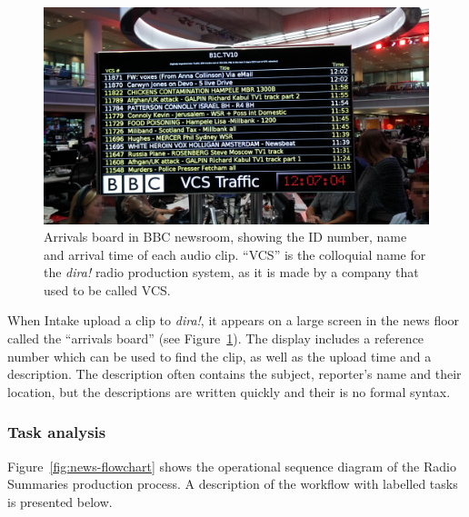 \begin{figure}[p]
  \centering
  \includegraphics[width=\columnwidth]{figs/news-intake-pixelated.jpg}
  \caption[Arrivals board in the BBC newsroom.]{Arrivals board in BBC newsroom, showing the ID number, name and arrival
  time of each audio clip.  ``VCS'' is the colloquial name for the \textit{dira!} radio production system, as it is
  made by a company that used to be called VCS.}
  \label{fig:news-arrivals}
\end{figure}

When Intake upload a clip to \textit{dira!}, it appears on a large screen in the news floor called the ``arrivals
board'' (see Figure~\ref{fig:news-arrivals}). The display includes a reference number which can be used to find the
clip, as well as the upload time and a description. The description often contains the subject, reporter's name and
their location, but the descriptions are written quickly and their is no formal syntax.

\subsubsection{Task analysis}
Figure~\ref{fig:news-flowchart} shows the operational sequence diagram of the Radio Summaries production process. A
description of the workflow with labelled tasks is presented below.

